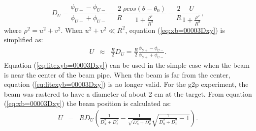 \documentclass[english,review,number,sort&compress]{elsarticle}
\begin{document}
\begin{equation}
D_{U}=\frac{\phi_{U+}-\phi_{U-}}{\phi_{U+}+\phi_{U-}}=\frac{2}{R}\frac{\rho cos(\theta-\theta_{0})}{1+\frac{\rho^{2}}{R^{2}}}=\frac{2}{R}\frac{U}{1+\frac{\rho^{2}}{R^{2}}},\label{eq:xb=00003Dxy}
\end{equation}
where $\rho^{2}=u^{2}+v^{2}$. When $u^{2}+v^{2}\ll R^{2}$, equation (\ref{eq:xb=00003Dxy}) is simplified as:
\begin{eqnarray}
U & \approx & \frac{R}{2}D_{U}=\frac{R}{2}\frac{\phi_{U+}-\phi_{U-}}{\phi_{U+}+\phi_{U-}}.\label{eq:litexyb=00003Dxy}
\end{eqnarray}
Equation (\ref{eq:litexyb=00003Dxy}) can be used in the simple case when the beam is near the center of the beam pipe. When the beam is far from the center, equation (\ref{eq:litexyb=00003Dxy}) is no longer valid. For the g2p experiment, the beam was rastered to have a diameter of about 2 cm at the target. From equation (\ref{eq:xb=00003Dxy}) the beam position is calculated as:
\begin{eqnarray}
U & = & RD_{U}(\frac{1}{D_{u}^{2}+D_{v}^{2}}-\frac{1}{\sqrt{D_{u}^{2}+D_{v}^{2}}}\sqrt{\frac{1}{D_{u}^{2}+D_{v}^{2}}-1}).\label{eq:realxy}
\end{eqnarray}
\end{document}
